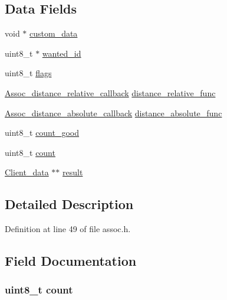 \subsection*{Data Fields}
\begin{DoxyCompactItemize}
\item 
void $\ast$ \hyperlink{struct_assoc__close__entries_a89491b1d291e113f86c1d33a3c1ec66b}{custom\+\_\+data}
\item 
uint8\+\_\+t $\ast$ \hyperlink{struct_assoc__close__entries_a037b65164e78b02017bd4751843037b4}{wanted\+\_\+id}
\item 
uint8\+\_\+t \hyperlink{struct_assoc__close__entries_aa2585d779da0ab21273a8d92de9a0ebe}{flags}
\item 
\hyperlink{assoc_8h_a4a7c48edbc47a30c9fa8c6fb0fe23817}{Assoc\+\_\+distance\+\_\+relative\+\_\+callback} \hyperlink{struct_assoc__close__entries_ada046356cf0fe3d4a2c18ac174d5eb0e}{distance\+\_\+relative\+\_\+func}
\item 
\hyperlink{assoc_8h_a0bac0791c4a8eac62f9f39c783da3b91}{Assoc\+\_\+distance\+\_\+absolute\+\_\+callback} \hyperlink{struct_assoc__close__entries_aedd1522117fb10fb74c7054f25f2d282}{distance\+\_\+absolute\+\_\+func}
\item 
uint8\+\_\+t \hyperlink{struct_assoc__close__entries_a086e0ce002c9491e4b99956740bb53d4}{count\+\_\+good}
\item 
uint8\+\_\+t \hyperlink{struct_assoc__close__entries_a20302e2c99a60d3f612dba57e3f6333b}{count}
\item 
\hyperlink{struct_client__data}{Client\+\_\+data} $\ast$$\ast$ \hyperlink{struct_assoc__close__entries_a40d6704f891338dadfa89f46b696be4c}{result}
\end{DoxyCompactItemize}


\subsection{Detailed Description}


Definition at line 49 of file assoc.\+h.



\subsection{Field Documentation}
\hypertarget{struct_assoc__close__entries_a20302e2c99a60d3f612dba57e3f6333b}{
\subsubsection[{count}]{\setlength{\rightskip}{0pt plus 5cm}uint8\+\_\+t count}}\label{struct_assoc__close__entries_a20302e2c99a60d3f612dba57e3f6333b}


